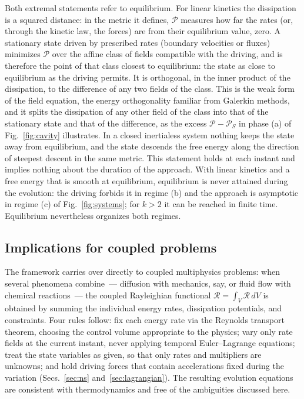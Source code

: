\documentclass[aip,pof,reprint,amsmath,amssymb,longbibliography]{revtex4-2}
\begin{document}
Both extremal statements refer to equilibrium. For linear kinetics the dissipation is a squared distance: in the metric it defines, $\mathcal{P}$ measures how far the rates (or, through the kinetic law, the forces) are from their equilibrium value, zero. A stationary state driven by prescribed rates (boundary velocities or fluxes) minimizes $\mathcal{P}$ over the affine class of fields compatible with the driving, and is therefore the point of that class closest to equilibrium: the state as close to equilibrium as the driving permits. It is orthogonal, in the inner product of the dissipation, to the difference of any two fields of the class. This is the weak form of the field equation, the energy orthogonality familiar from Galerkin methods, and it splits the dissipation of any other field of the class into that of the stationary state and that of the difference, as the excess $\mathcal{P} - \mathcal{P}_S$ in phase (a) of Fig.~\ref{fig:cavity} illustrates. In a closed inertialess system nothing keeps the state away from equilibrium, and the state descends the free energy along the direction of steepest descent in the same metric. This statement holds at each instant and implies nothing about the duration of the approach. With linear kinetics and a free energy that is smooth at equilibrium, equilibrium is never attained during the evolution: the driving forbids it in regime (b) and the approach is asymptotic in regime (c) of Fig.~\ref{fig:systems}; for $k > 2$ it can be reached in finite time. Equilibrium nevertheless organizes both regimes.


\subsection{Implications for coupled problems}
\label{sec:coupled}

The framework carries over directly to coupled multiphysics problems: when several phenomena combine~--- diffusion with mechanics, say, or fluid flow with chemical reactions~--- the coupled Rayleighian functional $\mathcal{R} = \int_V \mathscr{R}\, dV$ is obtained by summing the individual energy rates, dissipation potentials, and constraints. Four rules follow: fix each energy rate via the Reynolds transport theorem, choosing the control volume appropriate to the physics; vary only rate fields at the current instant, never applying temporal Euler--Lagrange equations; treat the state variables as given, so that only rates and multipliers are unknowns; and hold driving forces that contain accelerations fixed during the variation (Secs.~\ref{sec:ns} and~\ref{sec:lagrangian}). The resulting evolution equations are consistent with thermodynamics and free of the ambiguities discussed here.
\end{document}
